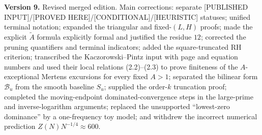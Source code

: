 \documentclass[11pt]{amsart}
\numberwithin{equation}{section}
\theoremstyle{plain}
\theoremstyle{definition}
\theoremstyle{remark}
\begin{document}
\medskip
\noindent\textbf{Version 9.} Revised merged edition.  Main corrections:
separate [PUBLISHED INPUT]/[PROVED HERE]/[CONDITIONAL]/[HEURISTIC] statuses;
unified terminal notation; expanded the triangular and fixed-$(L,H)$ proofs;
made the explicit $\widetilde A$ formula explicitly formal and justified the
residue $12$; corrected the pruning quantifiers and terminal indicators;
added the square-truncated RH criterion; transcribed the Kaczorowski--Pintz
input with page and equation numbers and used their local relations
(2.2)--(2.3) to prove finiteness of the $A$-exceptional Mertens excursions
for every fixed $A>1$; separated the bilinear form
$\mathcal B_u$ from the smooth baseline $S_u$; supplied the order-$k$
truncation proof; completed the moving-endpoint dominated-convergence steps
in the large-prime and inverse-logarithm arguments; replaced the unsupported
``lowest-zero dominance'' by a one-frequency toy model; and withdrew the
incorrect numerical prediction $Z(N)N^{-1/4}\approx600$.
\end{document}
